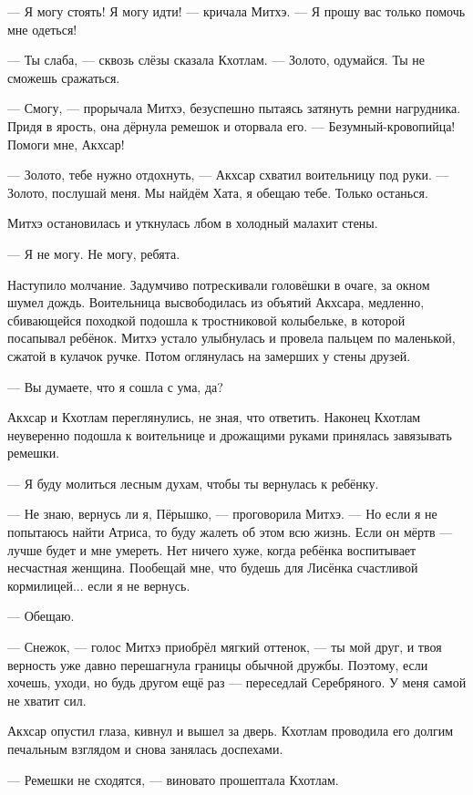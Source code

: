 \textspace

--- Я могу стоять!
Я могу идти! --- кричала Митхэ.
--- Я прошу вас только помочь мне одеться!

--- Ты слаба, --- сквозь слёзы сказала Кхотлам.
--- Золото, одумайся.
Ты не сможешь сражаться.

--- Смогу, --- прорычала Митхэ, безуспешно пытаясь затянуть ремни нагрудника.
Придя в ярость, она дёрнула ремешок и оторвала его.
--- Безумный-кровопийца!
Помоги мне, Акхсар!

--- Золото, тебе нужно отдохнуть, --- Акхсар схватил воительницу под руки.
--- Золото, послушай меня.
Мы найдём Хата, я обещаю тебе.
Только останься.

Митхэ остановилась и уткнулась лбом в холодный малахит стены.

--- Я не могу.
Не могу, ребята.

Наступило молчание.
Задумчиво потрескивали головёшки в очаге, за окном шумел дождь.
Воительница высвободилась из объятий Акхсара, медленно, сбивающейся походкой подошла к тростниковой колыбельке, в которой посапывал ребёнок.
Митхэ устало улыбнулась и провела пальцем по маленькой, сжатой в кулачок ручке.
Потом оглянулась на замерших у стены друзей.

--- Вы думаете, что я сошла с ума, да?

Акхсар и Кхотлам переглянулись, не зная, что ответить.
Наконец Кхотлам неуверенно подошла к воительнице и дрожащими руками принялась завязывать ремешки.

--- Я буду молиться лесным духам, чтобы ты вернулась к ребёнку.

--- Не знаю, вернусь ли я, Пёрышко, --- проговорила Митхэ.
--- Но если я не попытаюсь найти Атриса, то буду жалеть об этом всю жизнь.
Если он мёртв --- лучше будет и мне умереть.
Нет ничего хуже, когда ребёнка воспитывает несчастная женщина. Пообещай мне, что будешь для Лисёнка счастливой кормилицей...
если я не вернусь.

--- Обещаю.

--- Снежок, --- голос Митхэ приобрёл мягкий оттенок, --- ты мой друг, и твоя верность уже давно перешагнула границы обычной дружбы.
Поэтому, если хочешь, уходи, но будь другом ещё раз --- переседлай Серебряного.
У меня самой не хватит сил.

Акхсар опустил глаза, кивнул и вышел за дверь.
Кхотлам проводила его долгим печальным взглядом и снова занялась доспехами.

--- Ремешки не сходятся, --- виновато прошептала Кхотлам.

